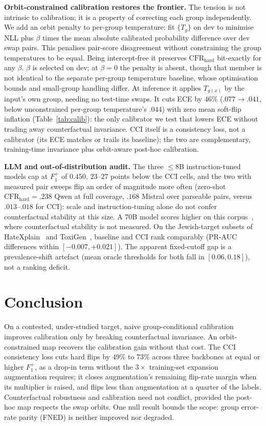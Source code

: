 \documentclass[11pt]{article}
\newcommand{\Fpos}{\ensuremath{F_1^{+}}\xspace}
\newcommand{\CFRh}{\ensuremath{\mathrm{CFR}_{\mathrm{hard}}}\xspace}
\begin{document}
\textbf{Orbit-constrained calibration restores the frontier.} The tension is not intrinsic to calibration; it is a property of correcting each group independently. We add an orbit penalty to per-group temperature: fit $\{T_g\}$ on dev to minimise NLL plus $\beta$ times the mean absolute calibrated probability difference over dev swap pairs. This penalises pair-score disagreement without constraining the group temperatures to be equal. Being intercept-free it preserves \CFRh{} bit-exactly for any $\beta$. $\beta$ is selected on dev; at $\beta{=}0$ the penalty is absent, though that member is not identical to the separate per-group temperature baseline, whose optimisation bounds and small-group handling differ. At inference it applies $T_{g(x)}$ by the input's own group, needing no test-time swaps. It cuts ECE by $46\%$ ($.077\to.041$, below unconstrained per-group temperature's $.044$) with zero mean soft-flip inflation (Table~\ref{tab:calib}): the only calibrator we test that lowers ECE without trading away counterfactual invariance. CCI itself is a consistency loss, not a calibrator (its ECE matches or trails its baseline); the two are complementary, training-time invariance plus orbit-aware post-hoc calibration.

\textbf{LLM and out-of-distribution audit.} The three $\le 8$B instruction-tuned models cap at \Fpos{} of $0.450$, $23$--$27$ points below the CCI cells, and the two with measured pair sweeps flip an order of magnitude more often (zero-shot $\CFRh{=}.238$ Qwen at full coverage, $.168$ Mistral over parseable pairs, versus $.013$--$.018$ for CCI): scale and instruction-tuning alone do not confer counterfactual stability at this size. A 70B model scores higher on this corpus~\citep{patel2025evaluating}, where counterfactual stability is not measured. On the Jewish-target subsets of HateXplain~\citep{mathew2021hatexplain} and ToxiGen~\citep{hartvigsen2022toxigen}, baseline and CCI rank comparably (PR-AUC differences within $[-0.007,+0.021]$). The apparent fixed-cutoff gap is a prevalence-shift artefact (mean oracle thresholds for both fall in $[0.06,0.18]$), not a ranking deficit.

\section{Conclusion}
\label{sec:conclusion}

On a contested, under-studied target, naive group-conditional calibration improves calibration only by breaking counterfactual invariance. An orbit-constrained map recovers the calibration gain without that cost. The CCI consistency loss cuts hard flips by $49\%$ to $73\%$ across three backbones at equal or higher \Fpos, as a drop-in term without the $3\times$ training-set expansion augmentation requires; it closes augmentation's remaining flip-rate margin when its multiplier is raised, and flips less than augmentation at a quarter of the labels. Counterfactual robustness and calibration need not conflict, provided the post-hoc map respects the swap orbits. One null result bounds the scope: group error-rate parity (FNED) is neither improved nor degraded.
\end{document}
